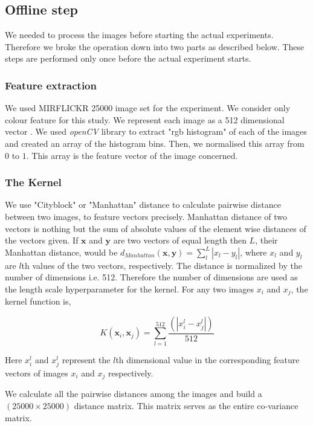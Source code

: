 \documentclass[english]{tktltiki}
\begin{document}
\subsection{Offline step}

We needed to process the images before starting the actual experiments. Therefore we broke the operation down into two parts as described below. These steps are performed only once before the actual experiment starts.

\subsubsection{Feature extraction}

We used MIRFLICKR 25000 \cite{mirflickr} image set for the experiment. We consider only colour feature for this study. We represent each image as a 512 dimensional vector \cite{imse}. We used \textit{openCV} library to extract "rgb histogram" of each of the images and created an array of the histogram bins. Then, we normalised this array from $0$ to $1$. This array is the feature vector of the image concerned.
\subsubsection{The Kernel}

We use "Cityblock" or "Manhattan" distance to calculate pairwise distance between two images, to feature vectors precisely. Manhattan distance of two vectors is nothing but the sum of absolute values of the element wise distances of the vectors given. If $\mathbf{x}$ and $\mathbf{y}$ are two vectors of equal length then $L$, their Manhattan distance, would be $d_{Manhattan}(\mathbf{x}, \mathbf{y}) = \sum \limits_l^L |x_l - y_l|$, where $x_l$ and $y_l$ are $l$th values of the two vectors, respectively. The distance is normalized by the number of dimensions i.e. 512. Therefore the number of dimensions are used as the length scale hyperparameter for the kernel. For any two images $x_i$ and $x_j$, the kernel function is,

\begin{equation}
K(\mathbf{x}_i, \mathbf{x}_j) = \sum_{l = 1}^{512}\frac{(|x_i^l - x_j^l|)} {512}
\end{equation}

Here $x_i^l$ and $x_j^l$ represent the $l$th dimensional value in the corresponding feature vectors of images $x_i$ and $x_j$ respectively.


We calculate all the pairwise distances among the images and build a $(25000 \times 25000)$ distance matrix. This matrix serves as the entire co-variance matrix.
\end{document}
